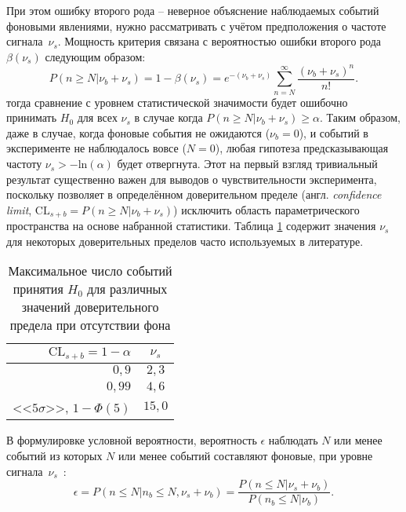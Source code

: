 При этом ошибку второго рода -- %
неверное объяснение наблюдаемых событий фоновыми явлениями,
нужно рассматривать с учётом предположения о частоте
сигнала~$\nu_s$. Мощность критерия связана с вероятностью ошибки
второго рода $\beta(\nu_s)$ следующим образом:
\begin{equation}
    P(n \ge N|\nu_b + \nu_s)
        = 1 - \beta(\nu_s) = e^{-(\nu_b + \nu_s)} \sum\limits_{n=N}^{\infty} \frac{(\nu_b + \nu_s)^n}{n!}.
\end{equation}
тогда сравнение с уровнем статистической значимости 
будет ошибочно принимать $H_0$ для всех $\nu_s$ в случае
когда $P(n \ge N|\nu_b + \nu_s)\ge\alpha$. Таким образом, даже
в случае, когда фоновые события не ожидаются ($\nu_b = 0$),
и событий в эксперименте не наблюдалось вовсе ($N=0$),
любая гипотеза предсказывающая частоту $\nu_s > -\text{ln}(\alpha)$
будет отвергнута. Этот на первый взгляд тривиальный результат
существенно важен для
выводов о чувствительности эксперимента, поскольку позволяет
в определённом доверительном пределе (англ. \emph{confidence limit},
$\text{CL}_{s+b} = P(n \ge N|\nu_b + \nu_s)$)
исключить область параметрического пространства на основе
набранной статистики. Таблица \ref{tab:cls-alpha-examples}
содержит значения $\nu_s$ для некоторых доверительных пределов часто
используемых в литературе.

\begin{table}[ht]
    \centering
    \begin{tabular}{r|c}
        $\text{CL}_{s+b} = 1 - \alpha$ & $\nu_s$ \\ \hline
        $0{,}9$ & $2{,}3$ \\
        $0{,}99$ & $4{,}6$ \\
        <<$5 \sigma$>>, $ 1 - \Phi(5)$ & $15{,}0$
    \end{tabular}
    \caption{Максимальное число событий принятия $H_0$ для
    различных значений доверительного предела при отсутствии
    фона}
    \label{tab:cls-alpha-examples}
\end{table}

В формулировке условной вероятности,
вероятность $\epsilon$ наблюдать $N$ или менее событий из
которых $N$ или менее событий составляют фоновые, при уровне
сигнала~$\nu_s$~\cite{cls-mtd-zech}:
\begin{equation}
    \epsilon =P(n \le N | n_b \le N, \nu_s + \nu_b) = \frac{P(n \le N | \nu_s +\nu_b)}{P(n_b \le N | \nu_b)}.
    \label{eq:cls-cond-prob}
\end{equation}

